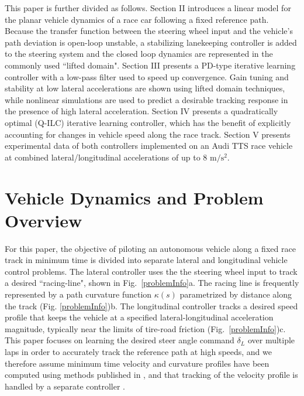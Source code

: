 \documentclass[letterpaper, 10 pt, conference]{ieeeconf}  %
\begin{document}
 This paper is further divided as follows. Section II introduces a linear model for the planar vehicle dynamics of a race car following a fixed reference path. Because the transfer function between
the steering wheel input and the vehicle's path deviation is open-loop unstable, a stabilizing lanekeeping controller is added to the steering system and the closed loop dynamics
are represented in the commonly used ``lifted domain". Section III presents a PD-type iterative learning controller with a low-pass filter used to speed
up convergence. Gain tuning and stability at low lateral accelerations are shown using lifted domain techniques, while nonlinear simulations are used to predict a desirable tracking response in the presence of
high lateral acceleration. Section IV presents a quadratically optimal (Q-ILC) iterative learning controller, which has the benefit of explicitly
accounting for changes in vehicle speed along the race track. Section V presents experimental data of both controllers implemented on an Audi TTS race vehicle at combined 
lateral/longitudinal accelerations of up to 8 $\mathrm{m/s^2}$.
 
\section{Vehicle Dynamics and Problem Overview}
\label{sec:problemDescription}

For this paper, the objective of piloting an autonomous vehicle along a fixed race track in minimum time is divided into separate lateral and longitudinal vehicle control problems. The lateral 
controller uses the the steering wheel input to track a desired ``racing-line", shown in 
Fig.~\ref{problemInfo}a. The racing line is frequently represented by a path curvature function $\kappa(s)$ parametrized by distance along the track (Fig. \ref{problemInfo})b. 
The longitudinal controller tracks a desired speed profile that keeps the vehicle at a specified lateral-longitudinal acceleration magnitude, typically near the limits of tire-road friction (Fig.~\ref{problemInfo})c. 
This paper focuses on learning the desired steer angle command $\delta_L$ over multiple laps in order to accurately track the reference path at high speeds, and we therefore assume minimum time 
velocity and curvature profiles have been computed using methods published in \cite{theodosis}, and that tracking of the velocity profile is handled by a separate controller \cite{mickthesis}. 
\end{document}

